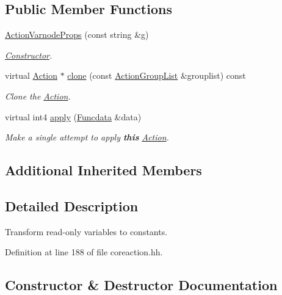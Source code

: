 \subsection*{Public Member Functions}
\begin{DoxyCompactItemize}
\item 
\mbox{\hyperlink{class_action_varnode_props_a52f6de156a43bc14318422eb8bb03b64}{Action\+Varnode\+Props}} (const string \&g)
\begin{DoxyCompactList}\small\item\em \mbox{\hyperlink{class_constructor}{Constructor}}. \end{DoxyCompactList}\item 
virtual \mbox{\hyperlink{class_action}{Action}} $\ast$ \mbox{\hyperlink{class_action_varnode_props_a5703787530b66de1bea8f6b33091d68f}{clone}} (const \mbox{\hyperlink{class_action_group_list}{Action\+Group\+List}} \&grouplist) const
\begin{DoxyCompactList}\small\item\em Clone the \mbox{\hyperlink{class_action}{Action}}. \end{DoxyCompactList}\item 
virtual int4 \mbox{\hyperlink{class_action_varnode_props_a531c9985eb2e6a5796009bea79a465fe}{apply}} (\mbox{\hyperlink{class_funcdata}{Funcdata}} \&data)
\begin{DoxyCompactList}\small\item\em Make a single attempt to apply {\bfseries{this}} \mbox{\hyperlink{class_action}{Action}}. \end{DoxyCompactList}\end{DoxyCompactItemize}
\subsection*{Additional Inherited Members}


\subsection{Detailed Description}
Transform read-\/only variables to constants. 

Definition at line 188 of file coreaction.\+hh.



\subsection{Constructor \& Destructor Documentation}
\mbox{\label{class_action_varnode_props_a52f6de156a43bc14318422eb8bb03b64}} 
